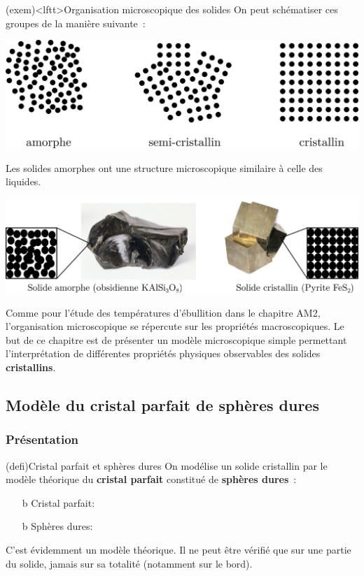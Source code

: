 \documentclass[../../main/main.tex]{subfiles}
\begin{document}
\begin{tcb}(exem)<lftt>{Organisation microscopique des solides}
	On peut schématiser ces groupes de la manière suivante~:
	\begin{center}
		\includegraphics[scale=1]{asc}
	\end{center}
	Les solides amorphes ont une structure microscopique similaire à celle des
	liquides.
	\begin{center}
		\includegraphics[scale=1]{exem_asc}
	\end{center}
\end{tcb}

Comme pour l'étude des températures d'ébullition dans le chapitre AM2,
l'organisation microscopique se répercute sur les propriétés macroscopiques.
Le but de ce chapitre est de présenter un modèle microscopique simple
permettant l'interprétation de différentes propriétés physiques observables
des solides \textbf{cristallins}.

\subsection{Modèle du cristal parfait de sphères dures}
\subsubsection{Présentation}

\begin{tcb*}(defi){Cristal parfait et sphères dures}
	On modélise un solide cristallin par le modèle théorique du
	\textbf{cristal parfait} constitué de \textbf{sphères dures}~:
	\begin{itemize}
		\item[b]{Cristal parfait}: 
		\item[b]{Sphères dures}: 
	\end{itemize}
\end{tcb*}
C'est évidemment un modèle théorique. Il ne peut être vérifié que sur une
partie du solide, jamais sur sa totalité (notamment sur le bord).
\end{document}
